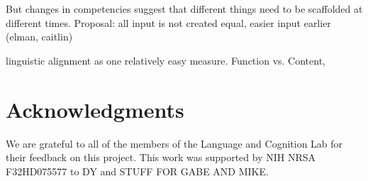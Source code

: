 \documentclass[10pt,letterpaper]{article}
\begin{document}
But changes in competencies suggest that different things need to be scaffolded at different times. Proposal: all input is not created equal, easier input earlier (elman, caitlin)

linguistic alignment as one relatively easy measure. Function vs. Content,



\section{Acknowledgments}

We are grateful to all of the members of the Language and Cognition Lab for their feedback on this project. This work was supported by NIH NRSA F32HD075577 to DY and STUFF FOR GABE AND MIKE.



\setlength{\bibleftmargin}{.125in}
\setlength{\bibindent}{-\bibleftmargin}


\end{document}
